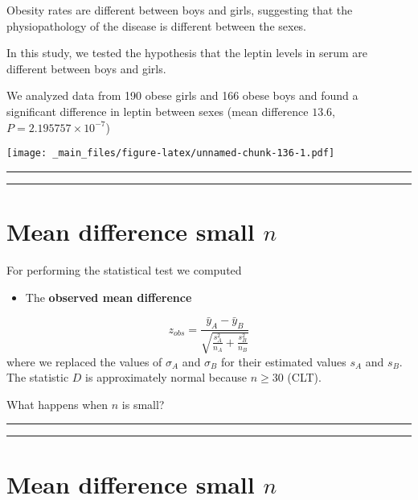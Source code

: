 \documentclass[
]{book}
\providecommand{\tightlist}{%
  \setlength{\itemsep}{0pt}\setlength{\parskip}{0pt}}
\begin{document}
Obesity rates are different between boys and girls, suggesting that the physiopathology of the disease is different between the sexes.

In this study, we tested the hypothesis that the leptin levels in serum are different between boys and girls.

We analyzed data from 190 obese girls and 166 obese boys and found a significant difference in leptin between sexes (mean difference \(13.6\), \(P=2.195757 \times 10^{-7}\))

\texttt{[image: \_main\_files/figure-latex/unnamed-chunk-136-1.pdf]}

\begin{center}\rule{0.5\linewidth}{0.5pt}\end{center}

\begin{center}\rule{0.5\linewidth}{0.5pt}\end{center}

\hypertarget{mean-difference-small-n}{%
\section{\texorpdfstring{Mean difference small \(n\)}{Mean difference small n}}\label{mean-difference-small-n}}

For performing the statistical test we computed

\begin{itemize}
\tightlist
\item
  The \textbf{observed mean difference}
\end{itemize}

\[z_{obs}=\frac{\bar{y}_A-\bar{y}_B }{\sqrt{\frac{s^2_A}{n_A}+\frac{s^2_B}{n_B}}}\]
where we replaced the values of \(\sigma_A\) and \(\sigma_B\) for their estimated values \(s_A\) and \(s_B\). The statistic \(D\) is approximately normal because \(n\ge 30\) (CLT).

What happens when \(n\) is small?

\begin{center}\rule{0.5\linewidth}{0.5pt}\end{center}

\begin{center}\rule{0.5\linewidth}{0.5pt}\end{center}

\hypertarget{mean-difference-small-n-1}{%
\section{\texorpdfstring{Mean difference small \(n\)}{Mean difference small n}}\label{mean-difference-small-n-1}}
\end{document}
